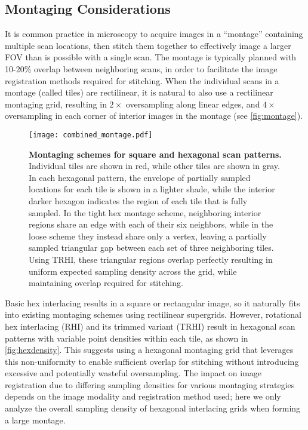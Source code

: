 \documentclass[aip, amsmath, amssymb, nobibnotes, nofootinbib, citeautoscript, reprint, superscriptaddress]{revtex4-2}
\begin{document}
    \subsection{\label{ssec:montaging}Montaging Considerations}

    It is common practice in microscopy to acquire images in a ``montage'' containing multiple scan locations, then stitch them together to
    effectively image a larger FOV than is possible with a single scan.
    The montage is typically planned with 10-20\% overlap between neighboring scans, in order to facilitate the image registration methods required for stitching.
    When the individual scans in a montage (called tiles) are rectilinear, it is natural to also use a rectilinear montaging grid, resulting in $2\times$ oversampling along linear edges, and $4\times$ oversampling in each corner of interior images in the montage (see \autoref{fig:montage}).

    \begin{figure*}
        \texttt{[image: combined\_montage.pdf]}
        \caption{
            \label{fig:montage}\textbf{Montaging schemes for square and hexagonal scan patterns.}
            Individual tiles are shown in red, while other tiles are shown in gray.
            In each hexagonal pattern, the envelope of partially sampled locations for each tile is shown in a lighter shade, while the interior darker hexagon indicates the region of each tile that is fully sampled.
            In the tight hex montage scheme, neighboring interior regions share an edge with each of their six neighbors, while in the loose scheme they instead share only a vertex, leaving a partially sampled triangular gap between each set of three neighboring tiles.
            Using TRHI, these triangular regions overlap perfectly resulting in uniform expected sampling density across the grid, while maintaining overlap required for stitching.
            }
    \end{figure*}

    Basic hex interlacing results in a square or rectangular image, so it naturally fits into existing montaging schemes using rectilinear supergrids.
    However, rotational hex interlacing (RHI) and its trimmed variant (TRHI) result in hexagonal scan patterns with variable point densities within each tile, as shown in \autoref{fig:hexdensity}.
    This suggests using a hexagonal montaging grid that leverages this non-uniformity to enable sufficient overlap for stitching without introducing excessive and potentially wasteful oversampling.
    The impact on image registration due to differing sampling densities for various montaging strategies depends on the image modality and registration method used; here we only analyze the overall sampling density of hexagonal interlacing grids when forming a large montage.
\end{document}

